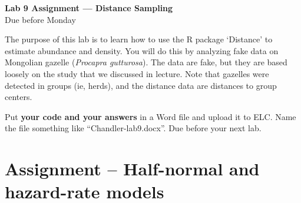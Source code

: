 \documentclass[12pt]{article}\usepackage[]{graphicx}\usepackage[]{color}
\begin{document}
{
  \Large
  \centering
  {\bf Lab 9 Assignment --- Distance Sampling \\ }
  Due before Monday \\
}

\vspace{24pt}

The purpose of this lab is to learn how to use the
R package `Distance' to estimate abundance and density. You will
do this by analyzing fake data on Mongolian gazelle ({\it Procapra
  gutturosa}). The data are fake, but they are based loosely on the
study that we discussed in lecture. Note that gazelles were detected
in groups (ie, herds), and the distance data are distances to group
centers. 

Put {\bf your code and your answers} in a Word file and upload it to
ELC. Name the file something like ``Chandler-lab9.docx''. Due before
your next lab.   



\section*{Assignment -- Half-normal and hazard-rate models}
\end{document}
